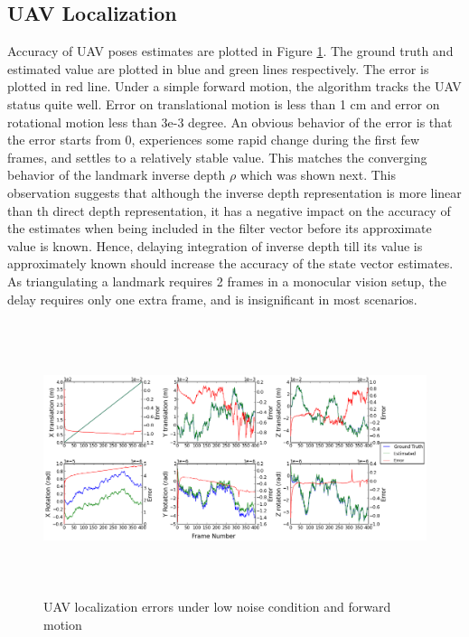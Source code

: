 \subsection{UAV Localization}
Accuracy of UAV poses estimates are plotted in Figure
\ref{fig:simfig1}. The ground truth and estimated value are plotted
in blue and green lines respectively. The error is plotted in red
line. Under a simple forward motion, the algorithm tracks the
UAV status quite well. Error on translational motion is less than 1
cm and error on rotational motion less than 3e-3 degree. An obvious
behavior of the error is that the error starts from 0, experiences
some rapid change during the first few frames, and settles to a
relatively stable value. This matches the converging behavior of the
landmark inverse depth $\rho$ which was shown next. This observation
suggests that although the inverse depth representation is more linear
than th direct depth representation, it has a negative impact on the
accuracy of the estimates when being included in the filter vector
before its approximate value is known. Hence, delaying integration of
inverse depth till its value is approximately known should increase
the accuracy of the state vector estimates. As triangulating a
landmark requires 2 frames in a monocular vision setup, the delay
requires only one extra frame, and is insignificant in most scenarios.

\begin{figure}[h]
\centering
\includegraphics[width=16cm, height=8cm]{./Figures/SimulationFigures/Figure1.png}
\caption{UAV localization errors under low noise condition and forward motion}
\label{fig:simfig1}
\end{figure}
\FloatBarrier

